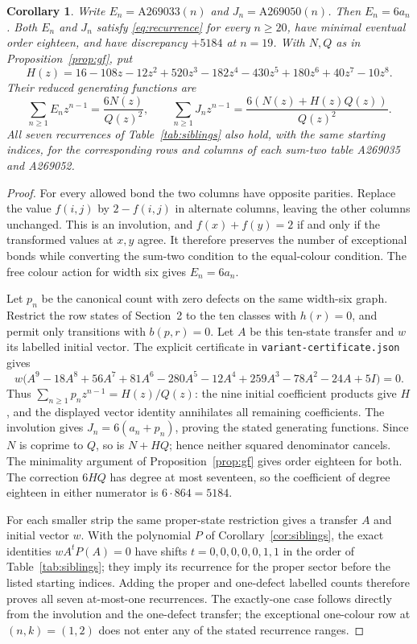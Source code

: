 \documentclass[11pt,a4paper]{article}
\newtheorem{corollary}[theorem]{Corollary}
\begin{document}
\begin{corollary}\label{cor:sum-two}
Write $E_n=\mathrm{A269033}(n)$ and $J_n=\mathrm{A269050}(n)$.
Then $E_n=6a_n$. Both $E_n$ and $J_n$ satisfy
\eqref{eq:recurrence} for every $n\geq20$, have minimal eventual
order eighteen, and have discrepancy $+5184$ at $n=19$.
With $N,Q$ as in Proposition~\ref{prop:gf}, put
\[
 H(z)=16-108z-12z^2+520z^3-182z^4-430z^5+180z^6+40z^7-10z^8.
\]
Their reduced generating functions are
\[
 \sum_{n\geq1}E_nz^{n-1}=\frac{6N(z)}{Q(z)^2},\qquad
 \sum_{n\geq1}J_nz^{n-1}=\frac{6(N(z)+H(z)Q(z))}{Q(z)^2}.
\]
All seven recurrences of Table~\ref{tab:siblings} also hold, with
the same starting indices, for the corresponding rows and columns
of each sum-two table A269035 and A269052.
\end{corollary}
\begin{proof}
For every allowed bond the two columns have opposite parities.
Replace the value $f(i,j)$ by $2-f(i,j)$ in alternate columns,
leaving the other columns unchanged. This is an involution, and
$f(x)+f(y)=2$ if and only if the transformed values at $x,y$ agree.
It therefore preserves the number of exceptional bonds while converting
the sum-two condition to the equal-colour condition. The free colour
action for width six gives $E_n=6a_n$.

Let $p_n$ be the canonical count with zero defects on the same width-six
graph. Restrict the row states of Section~2 to the ten classes with
$h(r)=0$, and permit only transitions with $b(p,r)=0$.
Let $A$ be this ten-state transfer and $w$ its labelled initial vector.
The explicit certificate in \texttt{variant-certificate.json} gives
\[
 w\bigl(A^9-18A^8+56A^7+81A^6-280A^5-12A^4
             +259A^3-78A^2-24A+5I\bigr)=0.
\]
Thus $\sum_{n\geq1}p_nz^{n-1}=H(z)/Q(z)$: the nine initial
coefficient products give $H$, and the displayed vector identity
annihilates all remaining coefficients. The involution gives
$J_n=6(a_n+p_n)$, proving the stated generating functions.
Since $N$ is coprime to $Q$, so is $N+HQ$; hence neither squared
denominator cancels. The minimality argument of
Proposition~\ref{prop:gf} gives order eighteen for both.
The correction $6HQ$ has degree at most seventeen, so the coefficient
of degree eighteen in either numerator is $6\cdot864=5184$.

For each smaller strip the same proper-state restriction gives
a transfer $A$ and initial vector $w$. With the polynomial $P$ of
Corollary~\ref{cor:siblings}, the exact identities $wA^tP(A)=0$
have shifts $t=0,0,0,0,0,1,1$ in the order of Table~\ref{tab:siblings};
they imply its recurrence for the proper sector before the listed
starting indices. Adding the proper and one-defect labelled counts
therefore proves all seven at-most-one recurrences. The exactly-one
case follows directly from the involution and the one-defect transfer;
the exceptional one-colour row at $(n,k)=(1,2)$ does not enter any
of the stated recurrence ranges.
\end{proof}
\end{document}
